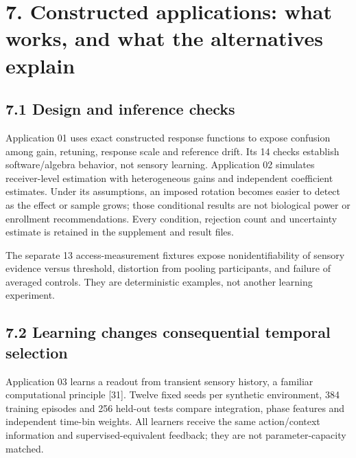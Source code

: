 \documentclass[
  american,
  11pt,
  letterpaper,
]{article}
\begin{document}
\section{7. Constructed applications: what works, and what the alternatives explain}\label{constructed-applications-what-works-and-what-the-alternatives-explain}

\subsection{7.1 Design and inference checks}\label{design-and-inference-checks}

Application 01 uses exact constructed response functions to expose confusion among gain, retuning, response scale and reference drift. Its 14 checks establish software/algebra behavior, not sensory learning. Application 02 simulates receiver-level estimation with heterogeneous gains and independent coefficient estimates. Under its assumptions, an imposed rotation becomes easier to detect as the effect or sample grows; those conditional results are not biological power or enrollment recommendations. Every condition, rejection count and uncertainty estimate is retained in the supplement and result files.

The separate 13 access-measurement fixtures expose nonidentifiability of sensory evidence versus threshold, distortion from pooling participants, and failure of averaged controls. They are deterministic examples, not another learning experiment.

\subsection{7.2 Learning changes consequential temporal selection}\label{learning-changes-consequential-temporal-selection}

Application 03 learns a readout from transient sensory history, a familiar computational principle {[}31{]}. Twelve fixed seeds per synthetic environment, 384 training episodes and 256 held-out tests compare integration, phase features and independent time-bin weights. All learners receive the same action/context information and supervised-equivalent feedback; they are not parameter-capacity matched.
\end{document}
